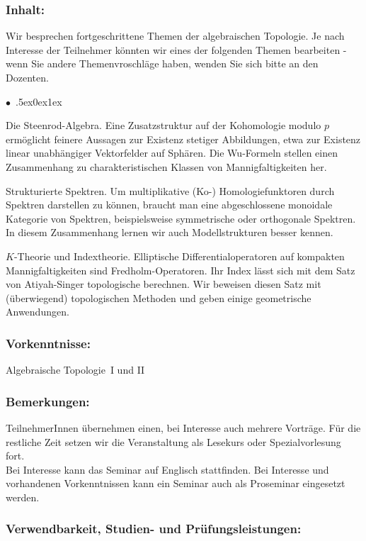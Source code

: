 \documentclass[a4paper,10pt]{article}
\renewenvironment{itemize}{\begin{list}{$\bullet$\ }{\itemsep.5ex\setlength{\topsep}{0.5\itemsep}\parsep0ex\labelsep1ex\settowidth{\labelwidth}{$\bullet$\ }\setlength{\leftmargin}{\labelwidth}\addtolength{\leftmargin}{3ex}\addtolength{\leftmargin}{\labelsep}}}{\end{list}}
\begin{document}
\subsubsection*{\large
    Inhalt:
}
Wir besprechen fortgeschrittene Themen der algebraischen Topologie.
Je nach Interesse der Teilnehmer könnten wir eines der folgenden Themen bearbeiten - wenn Sie andere Themenvroschläge haben, wenden Sie sich bitte an den Dozenten.
\begin{itemize}
\item Die Steenrod-Algebra. Eine Zusatzstruktur auf der Kohomologie modulo $p$
ermöglicht feinere Aussagen zur Existenz stetiger Abbildungen, etwa zur Existenz linear unabhängiger Vektorfelder auf Sphären. Die Wu-Formeln stellen einen Zusammenhang zu charakteristischen Klassen von Mannigfaltigkeiten her.
\item  Strukturierte Spektren. Um multiplikative (Ko-) Homologiefunktoren
durch Spektren darstellen zu können, braucht man eine abgeschlossene monoidale Kategorie von Spektren, beispielsweise
symmetrische oder orthogonale Spektren. In diesem Zusammenhang
lernen wir auch Modellstrukturen besser kennen.
\item $K$-Theorie und Indextheorie. Elliptische Differentialoperatoren auf kompakten Mannigfaltigkeiten sind Fredholm-Operatoren. Ihr Index lässt sich mit dem Satz von Atiyah-Singer topologische berechnen. Wir beweisen diesen Satz mit (überwiegend) topologischen Methoden und geben einige geometrische Anwendungen.
\end{itemize} 
\subsubsection*{\large
    Vorkenntnisse:
}
Algebraische Topologie~I und II
\subsubsection*{\large
    Bemerkungen:
}
TeilnehmerInnen übernehmen einen, bei Interesse auch mehrere Vorträge.
Für die restliche Zeit setzen wir die Veranstaltung als Lesekurs oder Spezialvorlesung fort. \\
Bei Interesse kann das Seminar auf Englisch stattfinden.
Bei Interesse und vorhandenen Vorkenntnissen kann ein Seminar auch als Proseminar eingesetzt werden.
\subsubsection*{\large
    Verwendbarkeit, Studien- und Prüfungsleistungen:
}
\end{document}
